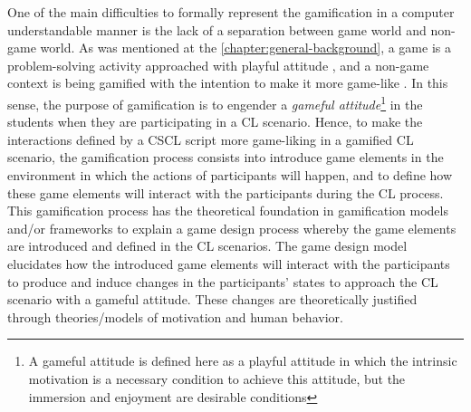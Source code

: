 One of the main difficulties to formally represent the gamification in a computer understandable manner is the lack of a separation between game world and non-game world.
As was mentioned at the \autoref{chapter:general-background}, a game is a problem-solving activity approached with playful attitude \cite{Schell2008}, and a non-game context is being gamified with the intention to make it more game-like \cite{Werbach2014}.
In this sense, the purpose of gamification is to engender a \emph{gameful attitude}\footnote{A gameful attitude is defined here as a playful attitude in which the intrinsic motivation is a necessary condition to achieve this attitude, but the immersion and enjoyment are desirable conditions} in the students when they are participating in a CL scenario.
Hence, to make the interactions defined by a CSCL script more game-liking in a gamified CL scenario, the gamification process consists into introduce game elements in the environment in which the actions of participants will happen, and to define how these game elements will interact with the participants during the CL process.
This gamification process has the theoretical foundation in gamification models and/or frameworks to explain a game design process whereby the game elements are introduced and defined in the CL scenarios.
The game design model elucidates how the introduced game elements will interact with the participants to produce and induce changes in the participants' states to approach the CL scenario with a gameful attitude. These changes are theoretically justified through theories/models of motivation and human behavior.

